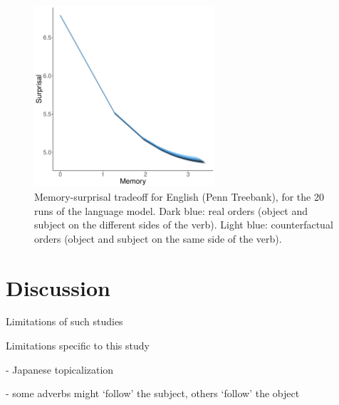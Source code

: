 \documentclass[11pt,a4paper]{article}
\begin{document}
\begin{figure}
    \centering
    \includegraphics[width=0.6\textwidth]{figures/ptb-memsurp.pdf}
\caption{Memory-surprisal tradeoff for English (Penn Treebank), for the 20 runs of the language model. Dark blue: real orders (object and subject on the different sides of the verb). Light blue: counterfactual orders (object and subject on the same side of the verb).}\label{fig:memsurp-ptb}
\end{figure}


\section{Discussion}

Limitations of such studies

Limitations specific to this study

- Japanese topicalization

- some adverbs might `follow' the subject, others `follow' the object

\end{document}
